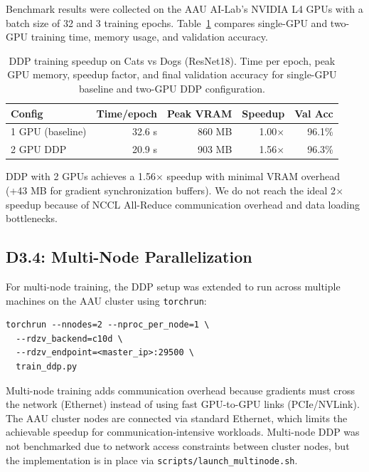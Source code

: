 \documentclass[10pt,twocolumn,letterpaper]{article}
\begin{document}
Benchmark results were collected on the AAU AI-Lab's NVIDIA L4 GPUs with a batch size of 32 and 3 training epochs. Table~\ref{tab:ddp} compares single-GPU and two-GPU training time, memory usage, and validation accuracy.

\begin{table}[h]
\centering
\caption{DDP training speedup on Cats vs Dogs (ResNet18). Time per epoch, peak GPU memory, speedup factor, and final validation accuracy for single-GPU baseline and two-GPU DDP configuration.}
\label{tab:ddp}
\begin{tabular}{@{} l r r r r @{}}
\toprule
\textbf{Config} & \textbf{Time/epoch} & \textbf{Peak VRAM} & \textbf{Speedup} & \textbf{Val Acc} \\
\midrule
1 GPU (baseline) & 32.6 s & 860 MB & 1.00$\times$ & 96.1\% \\
2 GPU DDP & 20.9 s & 903 MB & 1.56$\times$ & 96.3\% \\
\bottomrule
\end{tabular}
\end{table}

DDP with 2 GPUs achieves a 1.56$\times$ speedup with minimal VRAM overhead (+43 MB for gradient synchronization buffers). We do not reach the ideal 2$\times$ speedup because of NCCL All-Reduce communication overhead and data loading bottlenecks.

\subsection{D3.4: Multi-Node Parallelization}

For multi-node training, the DDP setup was extended to run across multiple machines on the AAU cluster using \texttt{torchrun}:

\begin{verbatim}
torchrun --nnodes=2 --nproc_per_node=1 \
  --rdzv_backend=c10d \
  --rdzv_endpoint=<master_ip>:29500 \
  train_ddp.py
\end{verbatim}

Multi-node training adds communication overhead because gradients must cross the network (Ethernet) instead of using fast GPU-to-GPU links (PCIe/NVLink). The AAU cluster nodes are connected via standard Ethernet, which limits the achievable speedup for communication-intensive workloads. Multi-node DDP was not benchmarked due to network access constraints between cluster nodes, but the implementation is in place via \texttt{scripts/launch\_multinode.sh}.
\end{document}

